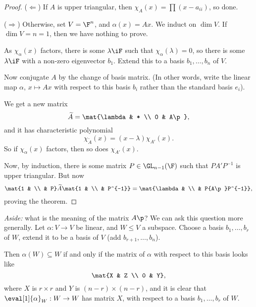 \begin{proof}
	($\Leftarrow$) If $A$ is upper triangular, then $\chi_A(x) = \prod (x-a_{ii})$, so done.
	
	($\Rightarrow$) Otherwise, set $V = \F^n$, and $\alpha (x) = Ax$. We induct on $\dim V$. If $\dim V=n=1$, then we have nothing to prove.
	
	As $\chi_\alpha(x)$ factors, there is some $\lambda\iF$ such that $\chi_\alpha(\lambda)=0$, so there is some $\lambda\iF$ with a non-zero eigenvector $b_1$. Extend this to a basis $b_1, \dots, b_n$ of $V$. 
	
	Now conjugate $A$ by the change of basis matrix.  (In other words, write the linear map $\alpha$, $x \mapsto Ax$ with respect to this basis $b_i$ rather than the standard basis $e_i$).


	We get a new matrix
	\begin{equation*}
		\widetilde{A} =  \mat{\lambda & * \\ 0 & A\p},
	\end{equation*}
	and it has characteristic polynomial 
	\begin{equation*}
		  \chi_{\widetilde{A}}(x)
		= \left( x-\lambda \right) \chi_{A'}(x).
	\end{equation*}
	So if $\chi_\alpha(x)$ factors, then so does $\chi_{A'}(x)$.
	
	Now, by induction, there is some matrix $P\in\GL_{n-1}(\F)$ such that $PA'P^{-1}$ is upper triangular. But now
	\begin{equation*}
		  \mat{1 & \\  & P} \widetilde{A} \mat{1 & \\  & P^{-1}}
		= \mat{\lambda & \\  & P{A\p}P^{-1}},
	\end{equation*}
	proving the theorem.
\end{proof}

\emph{Aside:} what is the meaning of the matrix $A\p$? We can ask this question more generally. Let $\alpha:V\to V$ be linear, and $W\leq V$ a subspace. Choose a basis $b_1,\ldots,b_r$ of $W$, extend it to be a basis of $V$ (add $b_{r+1},\ldots,b_n$).

Then $\alpha(W)\subseteq W$ if and only if the matrix of $\alpha$ with respect to this basis looks like
\begin{equation*}
	\mat{X & Z \\ 0 & Y},
\end{equation*}
where $X$ is $r\times r$ and $Y$ is $\left( n-r \right)\times\left( n-r \right)$, and it is clear that $\eval[1]{\alpha}_W:W\to W$ has matrix $X$, with respect to a basis $b_1,\ldots,b_r$ of $W$.

